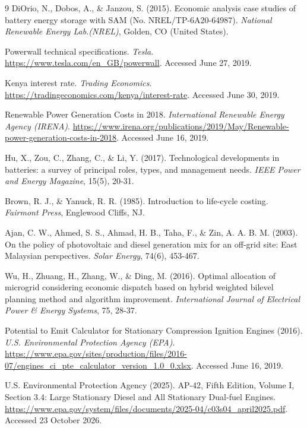 \documentclass[final,3p,times]{elsarticle}
\begin{document}
\begin{thebibliography}{9}
DiOrio, N., Dobos, A., \& Janzou, S. (2015). Economic analysis case studies of battery energy storage with SAM (No. NREL/TP-6A20-64987). \textit{National Renewable Energy Lab.(NREL)}, Golden, CO (United States).

Powerwall technical specifications. \textit{Tesla}. \url{https://www.tesla.com/en_GB/powerwall}. Accessed June 27, 2019.

Kenya interest rate. \textit{Trading Economics}. \url{https://tradingeconomics.com/kenya/interest-rate}. Accessed June 30, 2019.

Renewable Power Generation Costs in 2018. \textit{International Renewable Energy Agency (IRENA)}. \url{https://www.irena.org/publications/2019/May/Renewable-power-generation-costs-in-2018}. Accessed June 16, 2019.

Hu, X., Zou, C., Zhang, C., \& Li, Y. (2017). Technological developments in batteries: a survey of principal roles, types, and management needs. \textit{IEEE Power and Energy Magazine}, 15(5), 20-31.

Brown, R. J., \& Yanuck, R. R. (1985). Introduction to life-cycle costing. \textit{Fairmont Press}, Englewood Cliffs, NJ.

Ajan, C. W., Ahmed, S. S., Ahmad, H. B., Taha, F., \& Zin, A. A. B. M. (2003). On the policy of photovoltaic and diesel generation mix for an off-grid site: East Malaysian perspectives. \textit{Solar Energy}, 74(6), 453-467.

Wu, H., Zhuang, H., Zhang, W., \& Ding, M. (2016). Optimal allocation of microgrid considering economic dispatch based on hybrid weighted bilevel planning method and algorithm improvement. \textit{International Journal of Electrical Power \& Energy Systems}, 75, 28-37.

Potential to Emit Calculator for Stationary Compression Ignition Engines (2016). \textit{U.S. Environmental Protection Agency (EPA)}.
\url{https://www.epa.gov/sites/production/files/2016-07/engines_ci_pte_calculator_version_1.0_0.xlsx}. Accessed June 16, 2019.

U.S. Environmental Protection Agency (2025). AP-42, Fifth Edition, Volume I, Section 3.4: Large Stationary Diesel and All Stationary Dual-fuel Engines. \url{https://www.epa.gov/system/files/documents/2025-04/c03s04_april2025.pdf}. Accessed 23 October 2026.


\end{thebibliography}
\end{document}
